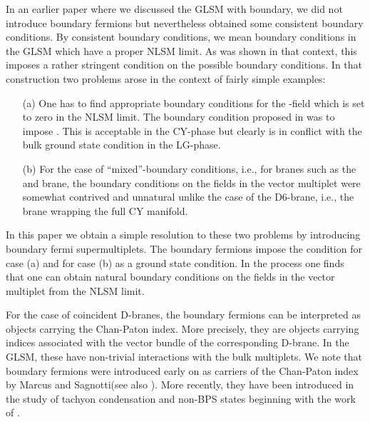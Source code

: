 \documentclass[a4paper,12pt]{article}
\begin{document}
In an earlier paper\cite{lsmone}
 where we discussed the GLSM with boundary, we did not
introduce boundary fermions but nevertheless obtained some consistent
boundary conditions. By consistent boundary conditions, we mean boundary
conditions in the GLSM which have a proper NLSM limit. As was shown in
that context, this imposes a rather stringent condition on the possible
boundary conditions. In that construction two problems arose in the
context of fairly simple examples:
\begin{enumerate}
\item[(a)] One has to find appropriate boundary conditions for the
\coordHE{}-field which is set to zero in the NLSM limit. The boundary
condition proposed in \cite{lsmone}
was to impose \coordHE{}. This is acceptable in the CY-phase but clearly
is in conflict with the bulk ground state condition in the LG-phase.
\item[(b)] For the case of ``mixed''-boundary conditions, i.e., for
branes such as the \coordHE{} and \coordHE{} brane, the boundary conditions on the
fields in the vector multiplet were somewhat contrived and unnatural
unlike the case of the D6-brane, i.e., the brane wrapping the full CY
manifold.
\end{enumerate}

In this paper we obtain a simple resolution to these two problems by
introducing boundary fermi supermultiplets. The boundary fermions
impose the condition \coordHE{} for case
(a) and \coordHE{} for case (b) as a ground state condition. In the
process one finds that one can obtain natural boundary conditions on the
fields in the vector multiplet from the NLSM limit. 


For the case of
coincident D-branes, the boundary fermions can be interpreted as objects
carrying the Chan-Paton index. More precisely, they are objects carrying
indices associated with the vector bundle of the corresponding D-brane.
In the GLSM, these have non-trivial interactions with the bulk
multiplets. We note that boundary fermions were introduced early on
as carriers of the Chan-Paton index by Marcus and Sagnotti\cite{ms}(see
also \cite{andtsyet}).
More recently, they have been introduced in the study of tachyon
condensation and non-BPS states beginning with the work of
\cite{wittenktheory,Kutasov:2000aq}.
\end{document}
